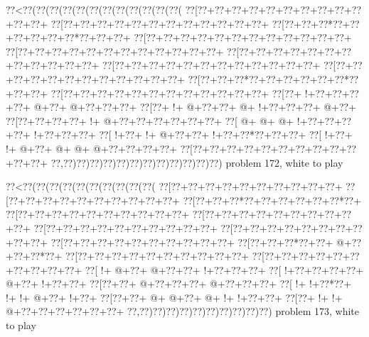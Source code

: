 \vbox{\vbox{\goo
\0??<\0??(\0??(\0??(\0??(\0??(\0??(\0??(\0??(\0??(\0??(\0??(\0??(
\0??[\0??+\0??+\0??+\0??+\0??+\0??+\0??+\0??+\0??+\0??+\0??+\0??+
\0??[\0??+\0??+\0??+\0??+\0??+\0??+\0??+\0??+\0??+\0??+\0??+\0??+
\0??[\0??+\0??+\0??*\0??+\0??+\0??+\0??+\0??+\0??*\0??+\0??+\0??+
\0??[\0??+\0??+\0??+\0??+\0??+\0??+\0??+\0??+\0??+\0??+\0??+\0??+
\0??[\0??+\0??+\0??+\0??+\0??+\0??+\0??+\0??+\0??+\0??+\0??+\0??+
\0??[\0??+\0??+\0??+\0??+\0??+\0??+\0??+\0??+\0??+\0??+\0??+\0??+
\0??[\0??+\0??+\0??+\0??+\0??+\0??+\0??+\0??+\0??+\0??+\0??+\0??+
\0??[\0??+\0??+\0??+\0??+\0??+\0??+\0??+\0??+\0??+\0??+\0??+\0??+
\0??[\0??+\0??+\0??*\0??+\0??+\0??+\0??+\0??+\0??*\0??+\0??+\0??+
\0??[\0??+\0??+\0??+\0??+\0??+\0??+\0??+\0??+\0??+\0??+\0??+\0??+
\0??[\0??+\- !+\0??+\0??+\0??+\0??+\- @+\0??+\- @+\0??+\0??+\0??+
\0??[\0??+\- !+\- @+\0??+\0??+\- @+\- !+\0??+\0??+\0??+\- @+\0??+
\0??[\0??+\0??+\0??+\0??+\- !+\- @+\0??+\0??+\0??+\0??+\0??+\0??+
\0??[\- @+\- @+\- @+\- !+\0??+\0??+\0??+\0??+\- !+\0??+\0??+\0??+
\0??[\- !+\0??+\- !+\- @+\0??+\0??+\- !+\0??+\0??*\0??+\0??+\0??+
\0??[\- !+\0??+\- !+\- @+\0??+\- @+\- @+\- @+\0??+\0??+\0??+\0??+
\0??[\0??+\0??+\0??+\0??+\0??+\0??+\0??+\0??+\0??+\0??+\0??+\0??+
\0??,\0??)\0??)\0??)\0??)\0??)\0??)\0??)\0??)\0??)\0??)\0??)\0??)
}
\hfil problem 172, white to play\hfil\break
}

\vbox{\vbox{\goo
\0??<\0??(\0??(\0??(\0??(\0??(\0??(\0??(\0??(\0??(\0??(
\0??[\0??+\0??+\0??+\0??+\0??+\0??+\0??+\0??+\0??+\0??+
\0??[\0??+\0??+\0??+\0??+\0??+\0??+\0??+\0??+\0??+\0??+
\0??[\0??+\0??+\0??*\0??+\0??+\0??+\0??+\0??+\0??*\0??+
\0??[\0??+\0??+\0??+\0??+\0??+\0??+\0??+\0??+\0??+\0??+
\0??[\0??+\0??+\0??+\0??+\0??+\0??+\0??+\0??+\0??+\0??+
\0??[\0??+\0??+\0??+\0??+\0??+\0??+\0??+\0??+\0??+\0??+
\0??[\0??+\0??+\0??+\0??+\0??+\0??+\0??+\0??+\0??+\0??+
\0??[\0??+\0??+\0??+\0??+\0??+\0??+\0??+\0??+\0??+\0??+
\0??[\0??+\0??+\0??*\0??+\0??+\- @+\0??+\0??+\0??*\0??+
\0??[\0??+\0??+\0??+\0??+\0??+\0??+\0??+\0??+\0??+\0??+
\0??[\0??+\0??+\0??+\0??+\0??+\0??+\0??+\0??+\0??+\0??+
\0??[\- !+\- @+\0??+\- @+\0??+\0??+\- !+\0??+\0??+\0??+
\0??[\- !+\0??+\0??+\0??+\0??+\- @+\0??+\- !+\0??+\0??+
\0??[\0??+\0??+\- @+\0??+\0??+\0??+\- @+\0??+\0??+\0??+
\0??[\- !+\- !+\0??*\0??+\- !+\- !+\- @+\0??+\- !+\0??+
\0??[\0??+\0??+\- @+\- @+\0??+\- @+\- !+\- !+\0??+\0??+
\0??[\0??+\- !+\- !+\- @+\0??+\0??+\0??+\0??+\0??+\0??+
\0??,\0??)\0??)\0??)\0??)\0??)\0??)\0??)\0??)\0??)\0??)
}
\hfil problem 173, white to play\hfil\break
}

